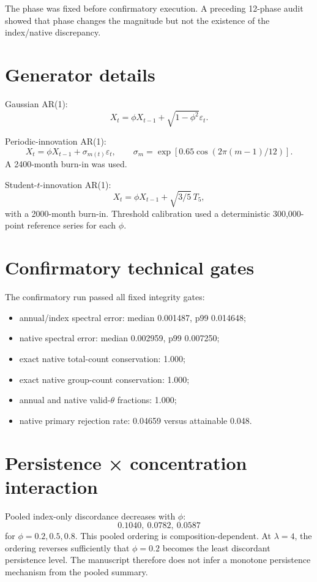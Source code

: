 The phase was fixed before confirmatory execution. A preceding 12-phase audit showed that phase changes the magnitude but not the existence of the index/native discrepancy.

\section{Generator details}\label{generator-details}

Gaussian AR(1): \[
X_t=\phi X_{t-1}+\sqrt{1-\phi^2}\varepsilon_t.
\]

Periodic-innovation AR(1): \[
X_t=\phi X_{t-1}+\sigma_{m(t)}\varepsilon_t,\qquad
\sigma_m=\exp[0.65\cos(2\pi(m-1)/12)].
\] A 2400-month burn-in was used.

Student-\(t\)-innovation AR(1): \[
X_t=\phi X_{t-1}+\sqrt{3/5}\,T_5,
\] with a 2000-month burn-in. Threshold calibration used a deterministic 300,000-point reference series for each \(\phi\).

\section{Confirmatory technical gates}\label{confirmatory-technical-gates}

The confirmatory run passed all fixed integrity gates:

\begin{itemize}
\tightlist
\item
  annual/index spectral error: median 0.001487, p99 0.014648;
\item
  native spectral error: median 0.002959, p99 0.007250;
\item
  exact native total-count conservation: 1.000;
\item
  exact native group-count conservation: 1.000;
\item
  annual and native valid-\(\theta\) fractions: 1.000;
\item
  native primary rejection rate: 0.04659 versus attainable 0.048.
\end{itemize}

\section{Persistence × concentration interaction}\label{persistence-concentration-interaction}

Pooled index-only discordance decreases with \(\phi\): \[
0.1040,\ 0.0782,\ 0.0587
\] for \(\phi=0.2,0.5,0.8\). This pooled ordering is composition-dependent. At \(\lambda=4\), the ordering reverses sufficiently that \(\phi=0.2\) becomes the least discordant persistence level. The manuscript therefore does not infer a monotone persistence mechanism from the pooled summary.

